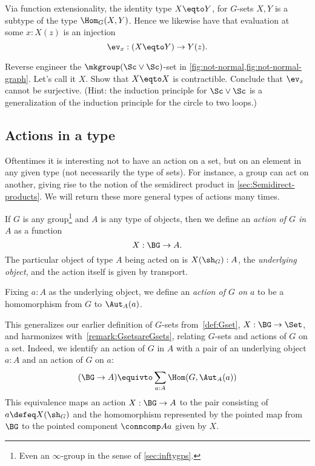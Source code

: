 Via function extensionality,
the identity type $X \eqto Y$, for $G$-sets $X,Y$
is a subtype of the type $\Hom_G(X,Y)$.
Hence we likewise have that evaluation at some $x:X(z)$ is an
injection
\[
  \ev_x:(X \eqto Y)\to Y(z).
\]
\begin{xca}\label{xca:not-normal}
Reverse engineer the $\mkgroup(\Sc\vee\Sc)$-set in \cref{fig:not-normal,fig:not-normal-graph}.
Let's call it $X$. Show that $X\eqto X$ is contractible.
Conclude that $\ev_x$ cannot be surjective.
(Hint: the induction principle for $\Sc\vee\Sc$ is a generalization
of the induction principle for the circle to two loops.)
\end{xca}

\subsection{Actions in a type}
\label{sec:actions}
Oftentimes it is interesting not to have an action on a set, but on an element in any given type (not necessarily the type of sets).  For instance, a group can act on another, giving rise to the notion of the semidirect product in \cref{sec:Semidirect-products}.  We will return these more general types of actions many times.

\begin{definition}\label{action}
  If $G$ is any group\footnote{%
  Even an $\infty$-group in the sense of \cref{sec:inftygps}.}
  and $A$ is any type of objects,
  then we define an \emph{action of $G$ in $A$} as a function
  \[
    X : \BG \to A.
  \]
  The particular object of type $A$ being acted on is $X(\sh_G):A$,
  the \emph{underlying object},
  and the action itself is given by transport.%

  Fixing $a:A$ as the underlying object, we define an \emph{action of $G$ on $a$}
  to be a homomorphism from $G$ to $\Aut_A(a)$.%
\end{definition}
This generalizes our earlier definition of $G$-sets
from~\cref{def:Gset}, $X : \BG \to \Set$,
and harmonizes with~\cref{remark:GsetsareGsets}, relating $G$-sets and
actions of $G$ on a set.
Indeed, we identify
an action of $G$ in $A$ with a pair of an underlying object
$a:A$ and an action of $G$ on $a$:
\[
  (\BG \to A) \equivto \sum_{a:A}\Hom(G,\Aut_A(a))
\]
This equivalence maps an action $X:\BG\to A$
to the pair consisting of $a \defeq X(\sh_G)$
and the homomorphism represented by the pointed map
from $\BG$ to the pointed component $\conncomp A a$ given by $X$.

